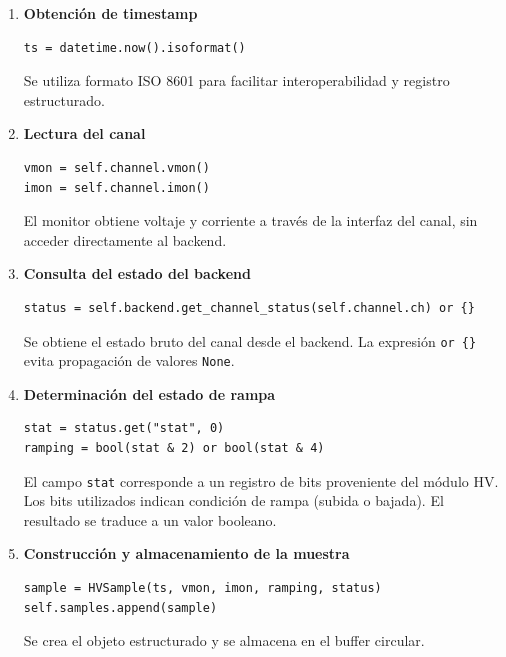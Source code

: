 \documentclass{article}
\begin{document}
\begin{enumerate}

\item \textbf{Obtención de timestamp}

\begin{lstlisting}
ts = datetime.now().isoformat()
\end{lstlisting}

Se utiliza formato ISO 8601 para facilitar interoperabilidad y registro estructurado.

\item \textbf{Lectura del canal}

\begin{lstlisting}
vmon = self.channel.vmon()
imon = self.channel.imon()
\end{lstlisting}

El monitor obtiene voltaje y corriente a través de la interfaz del canal, sin acceder directamente al backend.

\item \textbf{Consulta del estado del backend}

\begin{lstlisting}
status = self.backend.get_channel_status(self.channel.ch) or {}
\end{lstlisting}

Se obtiene el estado bruto del canal desde el backend. 
La expresión \texttt{or \{\}} evita propagación de valores \texttt{None}.

\item \textbf{Determinación del estado de rampa}

\begin{lstlisting}
stat = status.get("stat", 0)
ramping = bool(stat & 2) or bool(stat & 4)
\end{lstlisting}

El campo \texttt{stat} corresponde a un registro de bits proveniente del módulo HV. 
Los bits utilizados indican condición de rampa (subida o bajada). 
El resultado se traduce a un valor booleano.

\item \textbf{Construcción y almacenamiento de la muestra}

\begin{lstlisting}
sample = HVSample(ts, vmon, imon, ramping, status)
self.samples.append(sample)
\end{lstlisting}

Se crea el objeto estructurado y se almacena en el buffer circular.


\end{enumerate}
\end{document}
